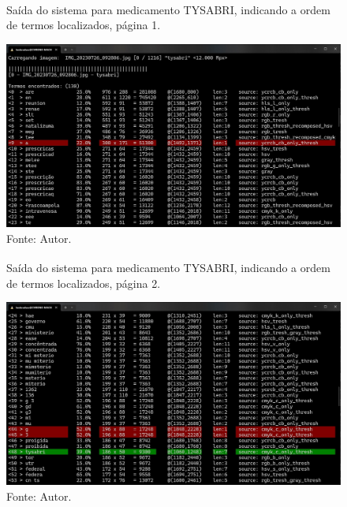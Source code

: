\begin{frame}
    \begin{figure}
        \centering
        \caption*{Saída do sistema para medicamento TYSABRI\textsuperscript{\small\textregistered}, indicando a ordem de termos localizados, página 1.}
        \includegraphics[height=0.72\textheight]{../pictures/terminal tysabri 1.jpg}
        \caption*{Fonte: Autor.}
    \end{figure}
\end{frame}

\begin{frame}
    \begin{figure}
        \centering
        \caption*{Saída do sistema para medicamento TYSABRI\textsuperscript{\small\textregistered}, indicando a ordem de termos localizados, página 2.}
        \includegraphics[height=0.72\textheight]{../pictures/terminal tysabri 2.jpg}
        \caption*{Fonte: Autor.}
    \end{figure}
\end{frame}


